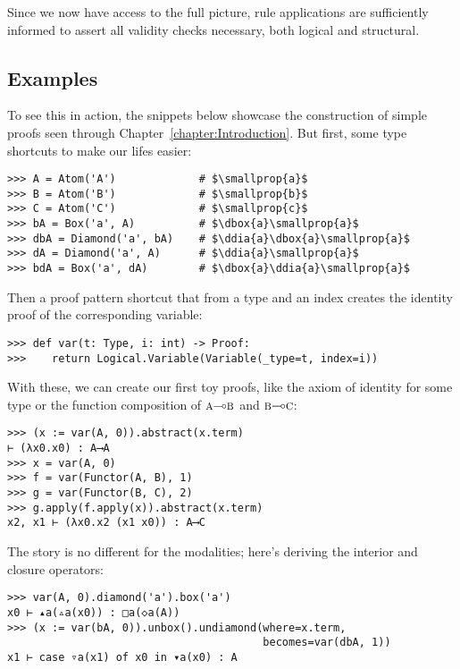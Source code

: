 \noindent Since we now have access to the full picture, rule applications are sufficiently informed to assert all validity checks necessary, both logical and structural.

\subsection{Examples}
To see this in action, the snippets below showcase the construction of simple proofs seen through Chapter~\ref{chapter:Introduction}.
But first, some type shortcuts to make our lifes easier:

\begin{verbatim}
>>> A = Atom('A')             # $\smallprop{a}$
>>> B = Atom('B')             # $\smallprop{b}$
>>> C = Atom('C')             # $\smallprop{c}$
>>> bA = Box('a', A)          # $\dbox{a}\smallprop{a}$
>>> dbA = Diamond('a', bA)    # $\ddia{a}\dbox{a}\smallprop{a}$
>>> dA = Diamond('a', A)      # $\ddia{a}\smallprop{a}$
>>> bdA = Box('a', dA)        # $\dbox{a}\ddia{a}\smallprop{a}$
\end{verbatim}

\noindent Then a proof pattern shortcut that from a type and an index creates the identity proof of the corresponding variable:
\begin{verbatim}
>>> def var(t: Type, i: int) -> Proof:
>>>    return Logical.Variable(Variable(_type=t, index=i))
\end{verbatim}

\noindent With these, we can create our first toy proofs, like the axiom of identity for some type  or the function composition of $\smallprop{a}\li\smallprop{b}$ and $\smallprop{b}\li\smallprop{c}$:
\begin{verbatim}
>>> (x := var(A, 0)).abstract(x.term)
⊢ (λx0.x0) : A⟶A
>>> x = var(A, 0)
>>> f = var(Functor(A, B), 1)
>>> g = var(Functor(B, C), 2)
>>> g.apply(f.apply(x)).abstract(x.term)
x2, x1 ⊢ (λx0.x2 (x1 x0)) : A⟶C
\end{verbatim}

\noindent The story is no different for the modalities; here's deriving the interior and closure operators:
\begin{verbatim}
>>> var(A, 0).diamond('a').box('a')
x0 ⊢ ▴a(▵a(x0)) : □a(◇a(A))
>>> (x := var(bA, 0)).unbox().undiamond(where=x.term, 
                                        becomes=var(dbA, 1))
x1 ⊢ case ▿a(x1) of x0 in ▾a(x0) : A
\end{verbatim}

